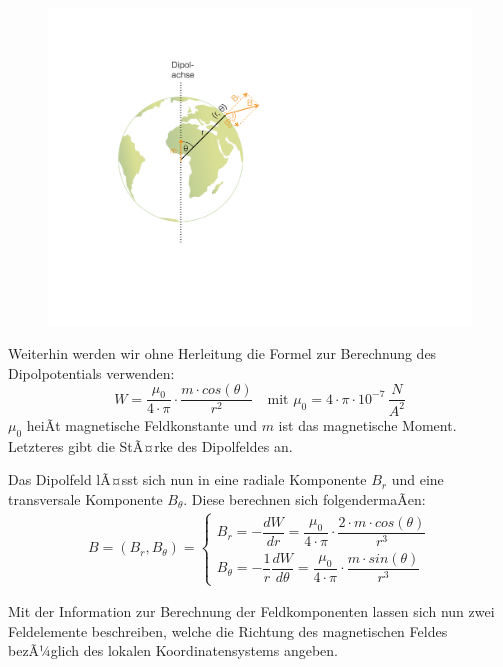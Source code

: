 \begin{figure}[H]
	\centering
	\includegraphics[scale = 0.6]{MagnetikBilder/PotentialDipol}
\end{figure}


 
Weiterhin werden wir ohne Herleitung die Formel zur Berechnung des Dipolpotentials verwenden: \begin{equation*}
	W = \frac{\mu_0}{4 \cdot \pi} \cdot \frac{m \cdot cos(\theta)}{r^2} \quad \text{mit } \mu_0 = 4 \cdot \pi \cdot 10^{-7}\,\si{\frac{N}{A^2}}
\end{equation*}
$\mu_0$ heiÃt magnetische Feldkonstante und $m$ ist das magnetische Moment. Letzteres gibt die StÃ¤rke des Dipolfeldes an.

Das Dipolfeld lÃ¤sst sich nun in eine radiale Komponente $B_r$ und eine transversale Komponente $B_{\theta}$. Diese berechnen sich folgendermaÃen: \begin{align*}
	B = (B_r, B_{\theta}) = \begin{cases}
		B_r = - \dfrac{dW}{dr} = \dfrac{\mu_0}{4 \cdot \pi} \cdot \dfrac{2 \cdot m \cdot cos(\theta)}{r^3} \\
		B_{\theta} = - \dfrac{1}{r} \dfrac{dW}{d \theta} = \dfrac{\mu_0}{4 \cdot \pi} \cdot \dfrac{m \cdot sin(\theta)}{r^3}
	\end{cases}
\end{align*}


Mit der Information zur Berechnung der Feldkomponenten lassen sich nun zwei Feldelemente beschreiben, welche die Richtung des magnetischen Feldes bezÃ¼glich des lokalen Koordinatensystems angeben.

